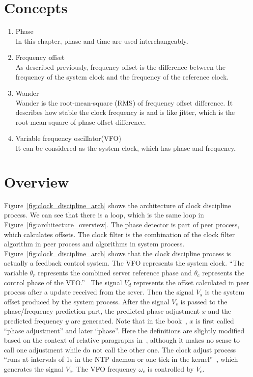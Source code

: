 \section{Concepts}%
\label{sec:clock_discipline_concepts}
\begin{enumerate}
    \item Phase\\
        In this chapter, phase and time are used interchangeably.
    \item Frequency offset\\
        As described previously, frequency offset is the difference between the
        frequency of the system clock and the frequency of the reference clock.
    \item Wander\\
        Wander is the root-mean-square (RMS) of frequency offset difference. It
        describes how stable the clock frequency is and is like jitter, which
        is the root-mean-square of phase offset difference.
    \item Variable frequency oscillator(VFO)\\
        It can be considered as the system clock, which has phase and
        frequency.
\end{enumerate}

\section{Overview}%
\label{sec:clock_discipline_overview}
Figure~\ref{fig:clock_discipline_arch} shows the architecture of clock
discipline process. We can see that there is a loop, which is the same loop in 
Figure~\ref{fig:architecture_overview}. The phase detector is part of peer
process, which calculates offsets. The clock filter is the combination of
the clock filter algorithm in peer process and algorithms in system process.
Figure~\ref{fig:clock_discipline_arch} shows that the clock discipline process
is actually a feedback control system. The VFO represents the system clock.
``The variable $\theta_r$ represents the combined server reference phase and
$\theta_c$ represents the control phase of the VFO.''~\cite{redbook} The signal
$V_d$ represents the offset calculated in peer process after a update received
from the sever. Then the signal $V_s$ is the system offset produced by the
system process. After the signal $V_s$ is passed to the phase/frequency
prediction part, the predicted phase adjustment $x$ and the predicted frequency
$y$ are generated. Note that in the book~\cite{redbook}, $x$ is first called
``phase adjustment'' and later ``phase''. Here the definitions are slightly
modified based on the context of relative paragraphs in~\cite{redbook},
although it makes no sense to call one adjustment while do not call the other
one. The clock adjust process ``runs at intervals of 1s in the NTP daemon or
one tick in the kernel''~\cite{redbook}, which generates the signal $V_c$. The
VFO frequency $\omega_c$ is controlled by $V_c$.


